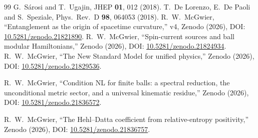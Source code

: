 \documentclass[11pt]{article}
\theoremstyle{definition}
\begin{document}
\begin{thebibliography}{99}
G.~S\'arosi and T.~Ugajin, JHEP \textbf{01}, 012 (2018).
T.~De Lorenzo, E.~De Paoli and S.~Speziale, Phys.\ Rev.\ D \textbf{98},
064053 (2018).
R.~W.~McGwier, ``Entanglement as the origin of spacetime curvature,''
v4, Zenodo (2026), DOI:
\href{https://doi.org/10.5281/zenodo.21821890}{10.5281/zenodo.21821890}.
R.~W.~McGwier, ``Spin-current sources and ball modular Hamiltonians,''
Zenodo (2026), DOI:
\href{https://doi.org/10.5281/zenodo.21824934}{10.5281/zenodo.21824934}.
R.~W.~McGwier, ``The New Standard Model for unified physics,''
Zenodo (2026), DOI:
\href{https://doi.org/10.5281/zenodo.21829536}{10.5281/zenodo.21829536}.

R.~W.~McGwier, ``Condition NL for finite balls: a spectral reduction, the unconditional metric sector, and a universal kinematic residue,''
Zenodo (2026), DOI:
\href{https://doi.org/10.5281/zenodo.21836572}{10.5281/zenodo.21836572}.

R.~W.~McGwier, ``The Hehl--Datta coefficient from relative-entropy positivity,''
Zenodo (2026), DOI:
\href{https://doi.org/10.5281/zenodo.21836757}{10.5281/zenodo.21836757}.

\end{thebibliography}
\end{document}
